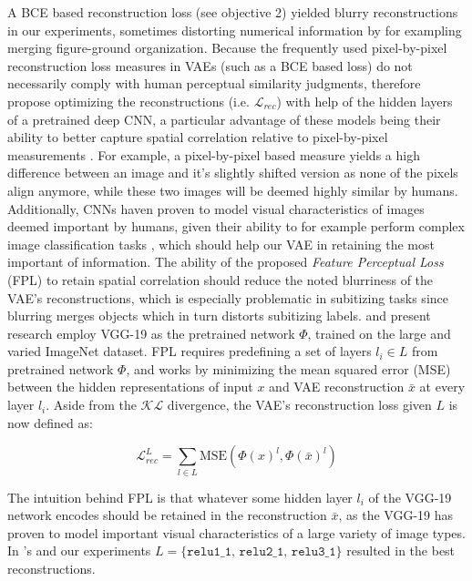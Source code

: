 \documentclass[twocolumn]{article}
\begin{document}
A BCE based reconstruction loss (see objective 2) yielded blurry reconstructions in our experiments, sometimes distorting numerical information by for exampling merging figure-ground organization.
Because the frequently used pixel-by-pixel reconstruction loss measures
in VAEs (such as a BCE based loss) do not necessarily comply with human perceptual similarity
judgments, \citet{hou2017deep} therefore propose optimizing the reconstructions (i.e. \(\mathcal{L}_{rec}\)) with help of the hidden layers of a pretrained deep CNN, a particular advantage of these models being their ability to better capture spatial correlation relative to pixel-by-pixel measurements \citep{hou2017deep}. For example, a pixel-by-pixel based measure yields a high difference between an image and it's slightly shifted version as none of the pixels align anymore, while these two images will be deemed highly similar by humans.
Additionally, CNNs haven proven to model visual characteristics of
images deemed important by humans, given their ability to for example perform
complex image classification tasks \citep{krizhevsky2012imagenet}, which should help our VAE in retaining the most important of information.  The ability
of the proposed \emph{Feature Perceptual Loss} (FPL) to retain spatial
correlation should reduce the noted blurriness
\citep[see for example]{larsen2015autoencoding} of the VAE's reconstructions, which is
especially problematic in subitizing tasks since blurring merges objects
which in turn distorts subitizing labels. \citet{hou2017deep} and
present research employ VGG-19 \citep{simonyan2014very} as the
pretrained network \(\Phi\), trained on the large and varied ImageNet
\citep{russakovsky2015imagenet} dataset. FPL requires predefining a set
of layers \(l_i \in L\) from pretrained network \(\Phi\), and works by
minimizing the mean squared error (MSE) between the hidden
representations of input \(x\) and VAE reconstruction \(\bar{x}\) at
every layer \(l_i\). Aside from the \(\mathcal{KL}\) divergence, the
VAE's reconstruction loss given $L$ is now defined as:

\[ \mathcal{L}^{L}_{rec} = \sum_{l \in L}^{} \textrm{MSE}(\Phi(x)^{l}, \Phi(\bar{x})^{l})\]

\noindent The intuition behind FPL is that whatever some hidden layer \(l_i\) of
the VGG-19 network encodes should be retained in the reconstruction
\(\bar{x}\), as the VGG-19 has proven to model important visual
characteristics of a large variety of image types. In
\citet{hou2017deep}'s and our experiments
\(L = \{\texttt{relu1\_1, relu2\_1, relu3\_1\}}\) resulted in the best
reconstructions. 
\end{document}
